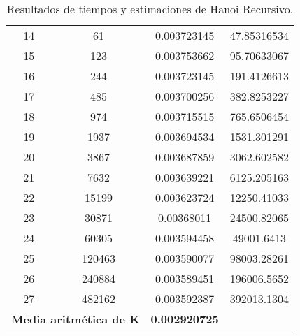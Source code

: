 \documentclass[a4paper,12pt]{article} %
\begin{document}
\begin{table}[H]
{\begin{tabular}{|c|c|c|c|}
			14                                                 & 61                   & 0.003723145                 & 47.85316534                                      \\
			15                                                 & 123                  & 0.003753662                 & 95.70633067                                      \\
			16                                                 & 244                  & 0.003723145                 & 191.4126613                                      \\
			17                                                 & 485                  & 0.003700256                 & 382.8253227                                      \\
			18                                                 & 974                  & 0.003715515                 & 765.6506454                                      \\
			19                                                 & 1937                 & 0.003694534                 & 1531.301291                                      \\
			20                                                 & 3867                 & 0.003687859                 & 3062.602582                                      \\
			21                                                 & 7632                 & 0.003639221                 & 6125.205163                                      \\
			22                                                 & 15199                & 0.003623724                 & 12250.41033                                      \\
			23                                                 & 30871                & 0.00368011                  & 24500.82065                                      \\
			24                                                 & 60305                & 0.003594458                 & 49001.6413                                       \\
			25                                                 & 120463               & 0.003590077                 & 98003.28261                                      \\
			26                                                 & 240884               & 0.003589451                 & 196006.5652                                      \\
			27                                                 & 482162               & 0.003592387                 & 392013.1304                                      \\
			\hline
			\multicolumn{2}{l}{\textbf{Media aritmética de K}} & \textbf{0.002920725}                                                                                  \\
			\hline
		\end{tabular}%
	}
	\caption{Resultados de tiempos y estimaciones de Hanoi Recursivo.}
	\label{tab:resultados}
\end{table}
\end{document}
